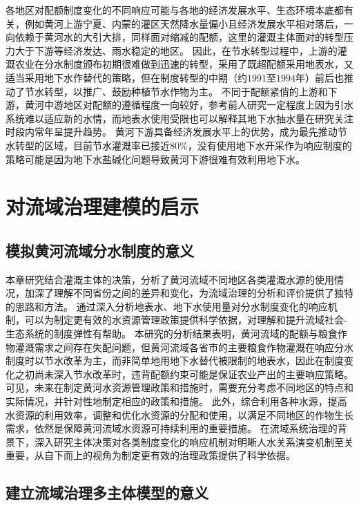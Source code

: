 各地区对配额制度变化的不同响应可能与各地的经济发展水平、生态环境本底都有关，例如黄河上游宁夏、内蒙的灌区天然降水量偏小且经济发展水平相对落后，一向依赖于黄河水的大引大排，同样面对缩减的配额，这里的灌溉主体面对的转型压力大于下游等经济发达、雨水稳定的地区。
因此，在节水转型过程中，上游的灌溉农业在分水制度颁布初期很难做到迅速的转型，采用了既超配额采用地表水，又适当采用地下水作替代的策略，但在制度转型的中期（约$1991$至$1994$年）前后也推动了节水转型，以推广、鼓励种植节水作物为主。
不同于配额紧俏的上游和下游，黄河中游地区对配额的遵循程度一向较好，参考前人研究一定程度上因为引水系统难以适应新的水情，而地表水使用受限也可以解释其地下水抽水量在研究关注时段内常年呈提升趋势。
黄河下游具备经济发展水平上的优势，成为最先推动节水转型的区域，目前节水灌溉率已接近$80\%$，没有使用地下水开采作为响应制度的策略可能是因为地下水盐碱化问题导致黄河下游很难有效利用地下水。


\section{对流域治理建模的启示}

\subsection{模拟黄河流域分水制度的意义}

本章研究结合灌溉主体的决策，分析了黄河流域不同地区各类灌溉水源的使用情况，加深了理解不同省份之间的差异和变化，为流域治理的分析和评价提供了独特的思路和方法。
通过深入分析地表水、地下水使用量对分水制度变化的响应机制，可以为制定更有效的水资源管理政策提供科学依据，对理解和提升流域社会-生态系统的制度弹性有帮助。
本研究的分析结果表明，黄河流域的配额与粮食作物灌溉需求之间存在失配问题，但黄河流域各省市的主要粮食作物灌溉在响应分水制度时以节水改革为主，而非简单地用地下水替代被限制的地表水，因此在制度变化之初尚未深入节水改革时，违背配额约束可能是保证农业产出的主要响应策略。
可见，未来在制定黄河水资源管理政策和措施时，需要充分考虑不同地区的特点和实际情况，并针对性地制定相应的政策和措施。
此外，综合利用各种水源，提高水资源的利用效率，调整和优化水资源的分配和使用，以满足不同地区的作物生长需求，依然是保障黄河流域水资源可持续利用的重要措施。
在流域系统治理的背景下，深入研究主体决策对各类制度变化的响应机制对明晰人水关系演变机制至关重要，从自下而上的视角为制定更有效的治理政策提供了科学依据。

\subsection{建立流域治理多主体模型的意义}

